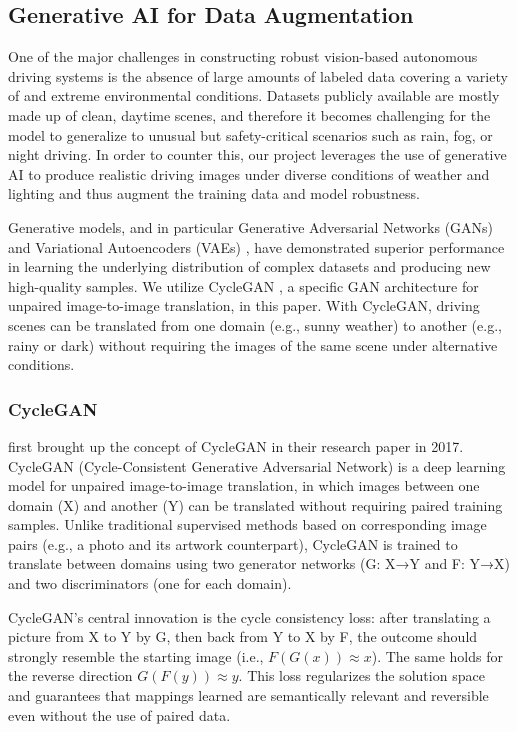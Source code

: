 \documentclass[pdflatex,sn-mathphys-num]{sn-jnl}%
\theoremstyle{thmstyleone}%
\theoremstyle{thmstyletwo}%
\theoremstyle{thmstylethree}%
\begin{document}
\subsection{Generative AI for Data Augmentation}
One of the major challenges in constructing robust vision-based autonomous driving systems is the absence of large amounts of labeled data covering a variety of and extreme environmental conditions. Datasets publicly available are mostly made up of clean, daytime scenes, and therefore it becomes challenging for the model to generalize to unusual but safety-critical scenarios such as rain, fog, or night driving. In order to counter this, our project leverages the use of generative AI to produce realistic driving images under diverse conditions of weather and lighting and thus augment the training data and model robustness.

Generative models, and in particular Generative Adversarial Networks (GANs) \cite{saxena2021generative} and Variational Autoencoders (VAEs) \cite{akkem2024comprehensive}, have demonstrated superior performance in learning the underlying distribution of complex datasets and producing new high-quality samples. We utilize CycleGAN \cite{zhu2017unpaired}, a specific GAN architecture for unpaired image-to-image translation, in this paper. With CycleGAN, driving scenes can be translated from one domain (e.g., sunny weather) to another (e.g., rainy or dark) without requiring the images of the same scene under alternative conditions. 

\subsubsection{CycleGAN}
\citet{zhu2017unpaired} first brought up the concept of CycleGAN in their research paper in 2017. CycleGAN (Cycle-Consistent Generative Adversarial Network) is a deep learning model for unpaired image-to-image translation, in which images between one domain (X) and another (Y) can be translated without requiring paired training samples. Unlike traditional supervised methods based on corresponding image pairs (e.g., a photo and its artwork counterpart), CycleGAN is trained to translate between domains using two generator networks (G: X→Y and F: Y→X) and two discriminators (one for each domain).

CycleGAN's central innovation is the cycle consistency loss: after translating a picture from X to Y by G, then back from Y to X by F, the outcome should strongly resemble the starting image (i.e., \( F(G(x)) \approx x \)). The same holds for the reverse direction \( G(F(y)) \approx y \). This loss regularizes the solution space and guarantees that mappings learned are semantically relevant and reversible even without the use of paired data.
\end{document}
